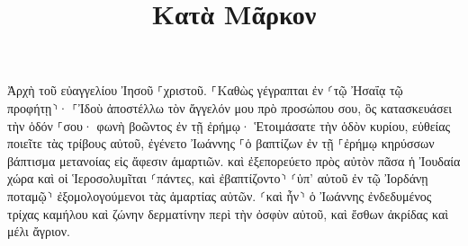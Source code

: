 \documentclass{openreader}
\title{Κατὰ Μᾶρκον}
\date{}
\begin{document}
\maketitle
\raggedbottom 
\fontsize{16pt}{24pt}\selectfont


Ἀρχὴ τοῦ εὐαγγελίου Ἰησοῦ ⸀χριστοῦ. 
⸀Καθὼς γέγραπται ἐν ⸂τῷ Ἠσαΐᾳ τῷ προφήτῃ⸃· ⸀Ἰδοὺ ἀποστέλλω τὸν ἄγγελόν μου πρὸ προσώπου σου, ὃς κατασκευάσει τὴν ὁδόν ⸀σου· 
φωνὴ βοῶντος ἐν τῇ ἐρήμῳ· Ἑτοιμάσατε τὴν ὁδὸν κυρίου, εὐθείας ποιεῖτε τὰς τρίβους αὐτοῦ, 
ἐγένετο Ἰωάννης ⸀ὁ βαπτίζων ἐν τῇ ⸀ἐρήμῳ κηρύσσων βάπτισμα μετανοίας εἰς ἄφεσιν ἁμαρτιῶν. 
καὶ ἐξεπορεύετο πρὸς αὐτὸν πᾶσα ἡ Ἰουδαία χώρα καὶ οἱ Ἱεροσολυμῖται ⸂πάντες, καὶ ἐβαπτίζοντο⸃ ⸂ὑπ’ αὐτοῦ ἐν τῷ Ἰορδάνῃ ποταμῷ⸃ ἐξομολογούμενοι τὰς ἁμαρτίας αὐτῶν. 
⸂καὶ ἦν⸃ ὁ Ἰωάννης ἐνδεδυμένος τρίχας καμήλου καὶ ζώνην δερματίνην περὶ τὴν ὀσφὺν αὐτοῦ, καὶ ἔσθων ἀκρίδας καὶ μέλι ἄγριον. 
\end{document}
